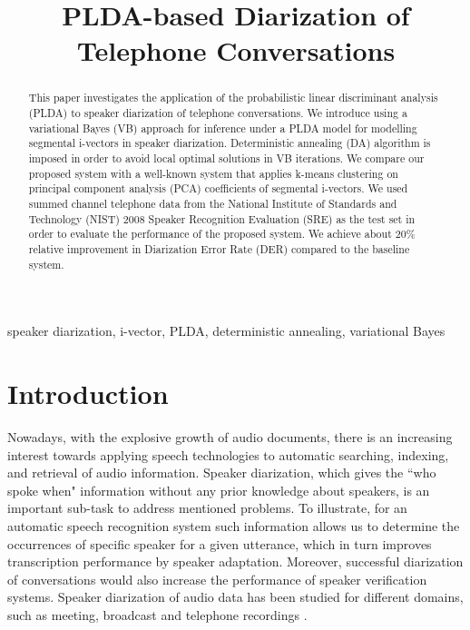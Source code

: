 \documentclass{article}
\title{PLDA-based Diarization of Telephone Conversations}
\begin{document}
%
\maketitle
%
\begin{abstract}


This paper investigates the application of the probabilistic linear discriminant analysis (PLDA) to speaker diarization of telephone conversations. We introduce using a variational Bayes (VB) approach for inference under a PLDA model for modelling segmental i-vectors in speaker diarization. Deterministic annealing (DA) algorithm is imposed in order to avoid local optimal solutions in VB iterations. We compare our proposed system with a well-known system that applies k-means clustering on principal component analysis (PCA) coefficients of segmental i-vectors. We used summed channel telephone data from the National Institute of Standards and Technology (NIST) 2008 Speaker Recognition Evaluation (SRE) as the test set in order to evaluate the performance of the proposed system. We achieve about 20\% relative improvement in Diarization Error Rate (DER) compared to the baseline system.
\end{abstract}
%
\begin{keywords}
speaker diarization,  i-vector, PLDA, deterministic annealing, variational Bayes
\end{keywords}
%
\section{Introduction}
\label{sec:intro}

Nowadays, with the explosive growth of audio documents, there is an increasing interest towards applying speech technologies to automatic searching, indexing, and retrieval of audio information. Speaker diarization, which gives the ``who spoke when" information without any prior knowledge about speakers, is an important sub-task to address mentioned problems. To illustrate, for an automatic speech recognition system such information allows us to determine the occurrences of specific speaker for a given utterance, which in turn improves transcription performance by speaker adaptation. Moreover, successful diarization of conversations would also increase the performance of speaker verification systems. Speaker diarization of audio data has been studied for different domains, such as meeting, broadcast and telephone recordings \cite{sun2010meeting, barras2006broadcast, kenny2010diarFA}. 
\end{document}
